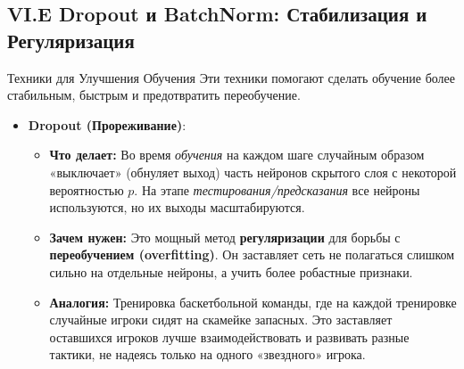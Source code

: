 \subsection{VI.E Dropout и BatchNorm: Стабилизация и Регуляризация}

\begin{myexampleblock}{Техники для Улучшения Обучения}
    Эти техники помогают сделать обучение более стабильным, быстрым и предотвратить переобучение.

    \begin{itemize}
        \item \textbf{Dropout (Прореживание)}:
            \begin{itemize}
                \item \textbf{Что делает:} Во время \textit{обучения} на каждом шаге случайным образом «выключает» (обнуляет выход) часть нейронов скрытого слоя с некоторой вероятностью $p$. На этапе \textit{тестирования/предсказания} все нейроны используются, но их выходы масштабируются.
                \item \textbf{Зачем нужен:} Это мощный метод \textbf{регуляризации} для борьбы с \textbf{переобучением (overfitting)}. Он заставляет сеть не полагаться слишком сильно на отдельные нейроны, а учить более робастные признаки.
                \item \textbf{Аналогия:} Тренировка баскетбольной команды, где на каждой тренировке случайные игроки сидят на скамейке запасных. Это заставляет оставшихся игроков лучше взаимодействовать и развивать разные тактики, не надеясь только на одного «звездного» игрока.
            \end{itemize}


\end{itemize}
\end{myexampleblock}
